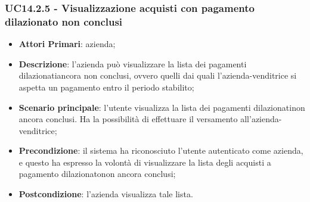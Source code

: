 \subsubsection{UC14.2.5 - Visualizzazione acquisti con pagamento dilazionato non conclusi}
\begin{itemize}
	\item \textbf{Attori Primari}: azienda;
	\item \textbf{Descrizione}: l'azienda può visualizzare la lista dei pagamenti dilazionati\glosp ancora non conclusi, ovvero quelli dai quali l'azienda-venditrice si aspetta un pagamento entro il periodo stabilito;
	\item \textbf{Scenario principale}: l'utente visualizza la lista dei pagamenti dilazionati\glosp non ancora conclusi. Ha la possibilità di effettuare il versamento all'azienda-venditrice;
	\item \textbf{Precondizione}: il sistema ha riconosciuto l'utente autenticato come azienda, e questo ha espresso la volontà di visualizzare la lista degli acquisti a pagamento dilazionato\glosp non ancora conclusi;
	\item \textbf{Postcondizione}: l'azienda visualizza tale lista.
\end{itemize}
